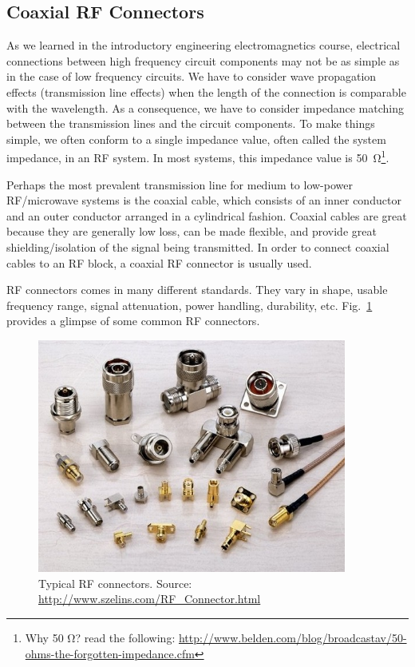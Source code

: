 \documentclass[letterpaper, 11pt]{article}
\begin{document}
\subsection{Coaxial RF Connectors}
As we learned in the introductory engineering electromagnetics course, electrical connections between high frequency circuit components may not be as simple as in the case of low frequency circuits. We have to consider wave propagation effects (transmission line effects) when the length of the connection is comparable with the wavelength. As a consequence, we have to consider impedance matching between the transmission lines and the circuit components. To make things simple, we often conform to a single impedance value, often called the system impedance, in an RF system. In most systems, this impedance value is \SI{50}{\ohm}\footnote{Why 50 Ω? read the following: \url{http://www.belden.com/blog/broadcastav/50-ohms-the-forgotten-impedance.cfm}}. 

Perhaps the most prevalent transmission line for medium to low-power RF/microwave systems is the coaxial cable, which consists of an inner conductor and an outer conductor arranged in a cylindrical fashion. Coaxial cables are great because they are generally low loss, can be made flexible, and provide great shielding/isolation of the signal being transmitted. In order to connect coaxial cables to an RF block, a coaxial RF connector is usually used. 

RF connectors comes in many different standards. They vary in shape, usable frequency range, signal attenuation, power handling, durability, etc. Fig.~\ref{fig:connectors} provides a glimpse of some common RF connectors. 

\begin{figure}[h]
	\centering
	\includegraphics[width=4in]{connectors}
	\caption{Typical RF connectors. Source: \url{http://www.szelins.com/RF_Connector.html}}
	\label{fig:connectors}
\end{figure}
\end{document}
